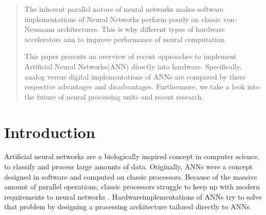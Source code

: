 \documentclass[conference]{IEEEtran}
\begin{document}
    \maketitle

    \begin{abstract}
        The inherent parallel nature of neural networks makes software implementations of Neural Networks perform poorly on classic
        von-Neumann architectures.
        This is why different types of hardware accelerators aim to improve performance of neural computation.

        This paper presents an overview of recent approaches to implement Artificial Neural Networks(ANN) directly into hardware.
        Specifically, analog versus digital implementations of ANNs are compared by there respective advantages and disadvantages.
        Furthermore, we take a look into the future of neural processing units and recent research.
    \end{abstract}





    \IEEEpeerreviewmaketitle



    \section{Introduction}

    Artificial neural networks are a biologically inspired concept in computer science, to classify and process large amounts of data.
    Originally, ANNs were a concept designed in software and computed on classic processors.
    Because of the massive amount of parallel operations, classic processors struggle to keep up with modern requirements to neural networks \cite{forssell2014hardware}.
    Hardwareimplementations of ANNs try to solve that problem by designing a processing architecture tailored directly to ANNs.
\end{document}
